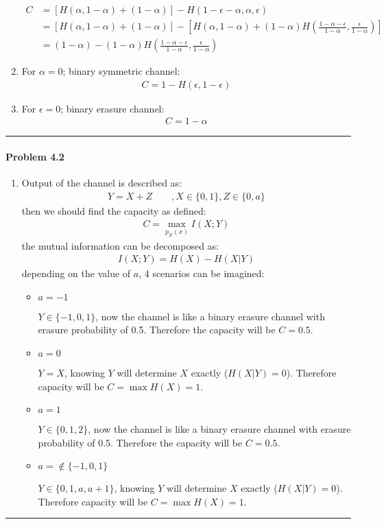 \documentclass[12pt, letterpaper]{scrartcl}
\begin{document}
\begin{enumerate}[((a))]
\begin{align*}
        C &= [H(\alpha,1-\alpha) + (1-\alpha)] - H(1-\epsilon-\alpha,\alpha,\epsilon)\\
        &=[H(\alpha,1-\alpha) + (1-\alpha)] -[H(\alpha,1-\alpha)+(1-\alpha)H(\frac{1-\alpha-\epsilon}{1-\alpha},\frac{\epsilon}{1-\alpha})]\\
        &=(1-\alpha) - (1-\alpha)H(\frac{1-\alpha-\epsilon}{1-\alpha},\frac{\epsilon}{1-\alpha}) 
    \end{align*}
    \item
    For $\alpha=0$; binary symmetric channel:
    \begin{align*}
        C=1-H(\epsilon, 1-\epsilon) 
    \end{align*}
    \item
    For $\epsilon=0$; binary erasure channel:
    \begin{align*}
        C=1-\alpha
    \end{align*}
\end{enumerate}
\hrule

\paragraph*{Problem 4.2} \hfill\newline
\begin{enumerate}[((a))]
    \item
    Output of the channel is described as:
    \begin{align*}
        Y=X+Z\qquad,X\in\{0,1\},Z\in\{0,a\}
    \end{align*}
    then we should find the capacity as defined:
    \begin{align*}
        C=\max_{p_{X}(x)} I(X;Y)
    \end{align*}
    the mutual information can be decomposed as:
    \begin{align*}
        I(X;Y)=H(X)-H(X|Y)
    \end{align*}
    depending on the value of $a$, 4 scenarios can be imagined:
    \begin{itemize}
        \item $a=-1$
        
        $Y\in\{-1,0,1\}$, now the channel is like a binary erasure channel with erasure probability of 0.5. Therefore the capacity will be $C=0.5$.
        \item $a=0$
        
        $Y=X$, knowing $Y$ will determine $X$ exactly ($H(X|Y)=0$). Therefore capacity will be $C=\max H(X)=1$.
        \item $a=1$
        
        $Y\in\{0,1,2\}$, now the channel is like a binary erasure channel with erasure probability of 0.5. Therefore the capacity will be $C=0.5$.
        \item $a=\notin\{-1, 0, 1\}$
        
        $Y\in\{0,1,a,a+1\}$, knowing $Y$ will determine $X$ exactly ($H(X|Y)=0$). Therefore capacity will be $C=\max H(X)=1$.
    \end{itemize}
\end{enumerate}
\hrule
\end{document}
